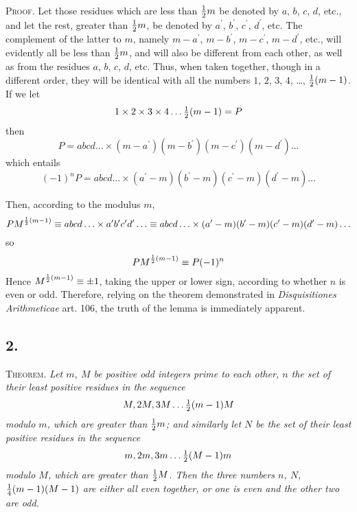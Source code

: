 \documentclass[twoside,12pt, showframe]{memoir}
\let\oldfrac\frac
\def\frac#1#2{\mathchoice{\tfrac{#1}{#2}}{\oldfrac{#1}{#2}}{\genfrac{}{}{}{2}{#1}{#2\mathstrut}}{\genfrac{}{}{}{3}{#1}{#2\mathstrut}}}
\begin{document}
\textsc{Proof.} Let those residues which are less than \(\frac{1}{2} m\) be denoted by \(a\), \(b\), \(c\), \(d\), etc., and let the rest, greater than \(\frac{1}{2} m\), be denoted by \(a^{\prime}\), \(b^{\prime}\), \(c^{\prime}\), \(d^{\prime}\), etc. The complement of the latter to \(m\), namely \(m-a^{\prime}\), \(m-b^{\prime}\), \(m-c^{\prime}\), \(m-d^{\prime}\), etc., will evidently all be less than \(\frac{1}{2} m\), and will also be different from each other, as well as from the residues \(a\), \(b\), \(c\), \(d\), etc. Thus, when taken together, though in a different order, they will be identical with all the numbers \(1\), \(2\), \(3\), \(4\), \ldots, \(\frac{1}{2}(m-1)\). If we let
\[1 \times 2 \times 3 \times 4 \ldots \frac{1}{2}(m-1)=P\]
then
\[P=a b c d \ldots \times(m-a^{\prime})(m-b^{\prime})(m-c^{\prime})(m-d^{\prime}) \ldots\]
which entails
\[(-1)^{n} P=a b c d \ldots \times(a^{\prime}-m)(b^{\prime}-m)(c^{\prime}-m)(d^{\prime}-m) \ldots\]
%

Then, according to the modulus \(m\),
\[P M^{\frac{1}{2}(m-1)} \equiv a b c d \ldots \times a^{\prime} b^{\prime} c^{\prime} d^{\prime} \ldots \equiv a b c d \ldots \times(a^{\prime}-m)(b^{\prime}-m)(c^{\prime}-m)(d^{\prime}-m) \ldots
\]
so
\[
P M^{\frac{1}{2}(m-1)} \equiv P(-1)^{n}
\]
Hence \(M^{\frac{1}{2}(m-1)} \equiv \pm 1\), taking the upper or lower sign, according to whether \(n\) is even or odd. Therefore, relying on the theorem demonstrated in \textit{Disquisitiones Arithmeticae} art. 106, the truth of the lemma is immediately apparent. 

%

\subsection*{2.}
 
\textsc{Theorem.} \textit{Let \(m\), \(M\) be positive odd integers prime to each other, \(n\) the set of their least positive residues in the sequence}
\[M, 2 M, 3 M \ldots  \frac{1}{2}(m-1) M\]
\textit{modulo \(m\), which are greater than \(\frac{1}{2} m\); and similarly let \(N\) be the set of their least positive residues in the sequence}
\[m, 2 m, 3 m \ldots \frac{1}{2}(M-1) m\]
\textit{modulo \(M\), which are greater than \(\frac{1}{2} M\). Then the three numbers \(n\), \(N\), \(\frac{1}{4}(m-1)(M-1)\) are either all even together, or one is even and the other two are odd.}
 
\end{document}
